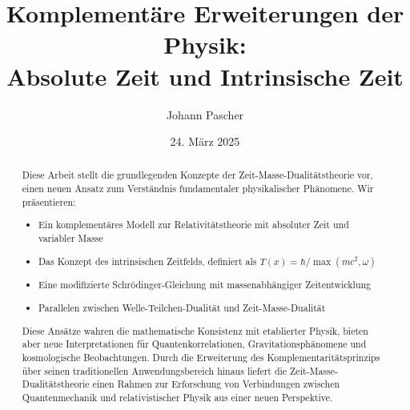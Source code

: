 \documentclass[a4paper,12pt]{article}
\newcommand{\Tfield}{T(x)}
\begin{document}
	
	\title{Komplementäre Erweiterungen der Physik: \\ Absolute Zeit und Intrinsische Zeit}
	\author{Johann Pascher}
	\date{24. März 2025}
	\maketitle
	
	\begin{abstract}
		Diese Arbeit stellt die grundlegenden Konzepte der Zeit-Masse-Dualitätstheorie vor, einen neuen Ansatz zum Verständnis fundamentaler physikalischer Phänomene. Wir präsentieren:
		
		\begin{itemize}
			\item Ein komplementäres Modell zur Relativitätstheorie mit absoluter Zeit und variabler Masse
			\item Das Konzept des intrinsischen Zeitfelds, definiert als \(\Tfield = \hbar/\max(mc^2, \omega)\)
			\item Eine modifizierte Schrödinger-Gleichung mit massenabhängiger Zeitentwicklung
			\item Parallelen zwischen Welle-Teilchen-Dualität und Zeit-Masse-Dualität
		\end{itemize}
		
		Diese Ansätze wahren die mathematische Konsistenz mit etablierter Physik, bieten aber neue Interpretationen für Quantenkorrelationen, Gravitationsphänomene und kosmologische Beobachtungen. Durch die Erweiterung des Komplementaritätsprinzips über seinen traditionellen Anwendungsbereich hinaus liefert die Zeit-Masse-Dualitätstheorie einen Rahmen zur Erforschung von Verbindungen zwischen Quantenmechanik und relativistischer Physik aus einer neuen Perspektive.
	\end{abstract}
	
	\tableofcontents
	\newpage
	
\end{document}
